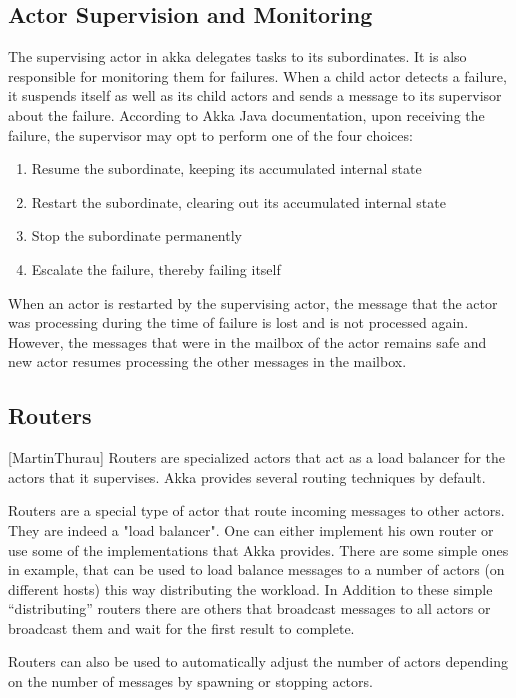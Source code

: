   \subsection{Actor Supervision and Monitoring}
  \label{subsec:supervisionMonitoring}
  The supervising actor in akka delegates tasks to its subordinates. It is also responsible for monitoring them for failures. When a child actor detects a failure, it suspends itself as well as its child actors and sends a message to its supervisor about the failure. According to Akka Java documentation, upon receiving the failure, the supervisor may opt to perform one of the four choices:~\cite{akkaJavaDoc}
  \begin{enumerate}
    \item Resume the subordinate, keeping its accumulated internal state
    \item Restart the subordinate, clearing out its accumulated internal state
    \item Stop the subordinate permanently
    \item Escalate the failure, thereby failing itself
  \end{enumerate}

  When an actor is restarted by the supervising actor, the message that the actor was processing during the time of failure is lost and is not processed again. However, the messages that were in the mailbox of the actor remains safe and new actor resumes processing the other messages in the mailbox. ~\cite{akkaJavaDoc}

  \subsection{Routers} [MartinThurau]
  Routers are specialized actors that act as a load balancer for the actors that it supervises. Akka provides several routing techniques by default.

  Routers are a special type of actor that route incoming messages to other actors. They are indeed a "load balancer". One can either implement his own router or use some of the implementations that Akka provides. There are some simple ones in example, that can be used to load balance messages to a number of actors (on different hosts) this way distributing the workload. In Addition to these simple “distributing” routers there are others that broadcast messages to all actors or broadcast them and wait for the first result to complete.

  Routers can also be used to automatically adjust the number of actors depending on the number of messages by spawning or stopping actors.

